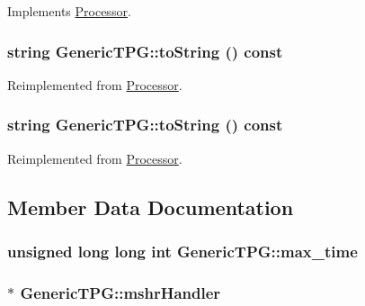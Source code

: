 Implements \hyperlink{classProcessor_495fad01358e2d9760c526d6e2db53ea}{Processor}.\hypertarget{classGenericTPG_c2e1dc7b0de824c846f37c4a1c282303}{
\subsubsection[{toString}]{\setlength{\rightskip}{0pt plus 5cm}string GenericTPG::toString () const}}
\label{classGenericTPG_c2e1dc7b0de824c846f37c4a1c282303}




Reimplemented from \hyperlink{classProcessor_d3bdbedfbb00b05f61504e411a418106}{Processor}.\hypertarget{classGenericTPG_c2e1dc7b0de824c846f37c4a1c282303}{
\subsubsection[{toString}]{\setlength{\rightskip}{0pt plus 5cm}string GenericTPG::toString () const}}
\label{classGenericTPG_c2e1dc7b0de824c846f37c4a1c282303}




Reimplemented from \hyperlink{classProcessor_d3bdbedfbb00b05f61504e411a418106}{Processor}.

\subsection{Member Data Documentation}
\hypertarget{classGenericTPG_f2b6690d9c38e72a408cde91480fe13e}{
\subsubsection[{max\_\-time}]{\setlength{\rightskip}{0pt plus 5cm}unsigned long long int {\bf GenericTPG::max\_\-time}}}
\label{classGenericTPG_f2b6690d9c38e72a408cde91480fe13e}


\hypertarget{classGenericTPG_03a0346d54282502eae314c9525da513}{
\subsubsection[{mshrHandler}]{ $\ast$ {\bf GenericTPG::mshrHandler}}}
\label{classGenericTPG_03a0346d54282502eae314c9525da513}


